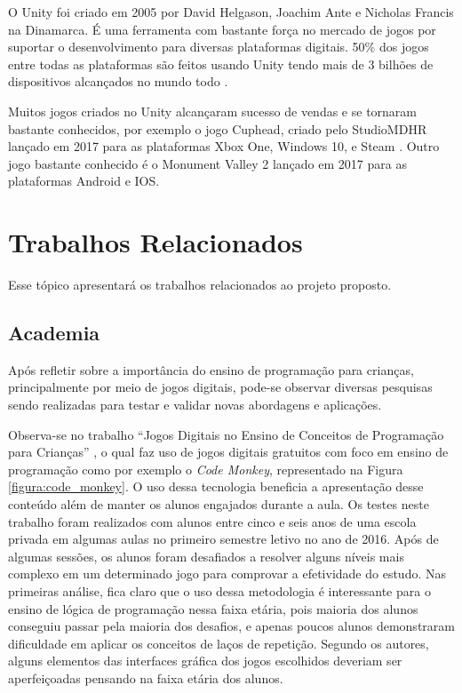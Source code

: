         O Unity foi criado em 2005 por David Helgason, Joachim Ante e Nicholas	
        Francis na Dinamarca. É uma ferramenta com bastante força no mercado de jogos por suportar o desenvolvimento para diversas plataformas digitais. 50\% dos jogos entre todas as plataformas são feitos usando Unity tendo mais de 3 bilhões de dispositivos alcançados no mundo todo \cite{dados_unity}.	

        Muitos jogos criados no Unity alcançaram sucesso de vendas e se tornaram bastante conhecidos, por exemplo o jogo Cuphead, criado pelo StudioMDHR lançado em 2017 para as plataformas Xbox One, Windows 10, e Steam \cite{cuphead}. Outro jogo bastante conhecido é o Monument Valley 2 lançado em 2017 para as plataformas Android e IOS\cite{monument_valley_2}.

\section{Trabalhos Relacionados}
Esse tópico apresentará os trabalhos relacionados ao projeto proposto.

\subsection{Academia}
Após refletir sobre a importância do ensino de programação para crianças, principalmente por meio de jogos digitais, pode-se observar diversas pesquisas sendo realizadas para testar e validar novas abordagens e aplicações. 

Observa-se no trabalho “Jogos Digitais no Ensino de Conceitos de Programação para Crianças” \cite{tadesco_2016}, o qual faz uso de jogos digitais gratuitos com foco em ensino de programação como por exemplo o \textit{Code Monkey}, representado na Figura \ref{figura:code_monkey}. O uso dessa tecnologia beneficia a apresentação desse conteúdo além de manter os alunos engajados durante a aula. Os testes neste trabalho foram realizados com alunos entre cinco e seis anos de uma escola privada em algumas aulas no primeiro semestre letivo no ano de 2016. Após de algumas sessões, os alunos foram desafiados a resolver alguns níveis mais complexo em um determinado jogo para comprovar a efetividade do estudo. Nas primeiras análise, fica claro que o uso dessa metodologia é  interessante para o ensino de lógica de programação nessa faixa etária, pois maioria dos alunos conseguiu passar pela maioria dos desafios, e apenas poucos alunos demonstraram dificuldade em aplicar os conceitos de laços de repetição. Segundo os autores, alguns elementos das interfaces gráfica dos jogos escolhidos deveriam ser aperfeiçoadas pensando na faixa etária dos alunos.

